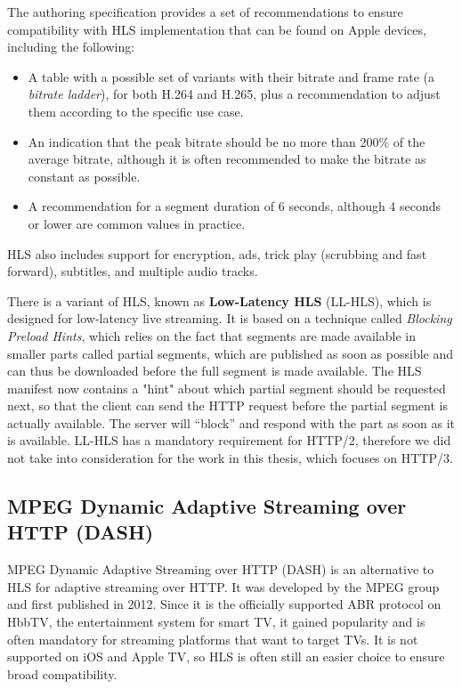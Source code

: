 The authoring specification provides a set of recommendations to ensure compatibility with HLS implementation that can be found on Apple devices, including the following:

\begin{itemize}
    \item A table with a possible set of variants with their bitrate and frame rate (a \textit{bitrate ladder}), for both H.264 and H.265, plus a recommendation to adjust them according to the specific use case.
    \item An indication that the peak bitrate should be no more than 200\% of the average bitrate, although it is often recommended to make the bitrate as constant as possible.\cite{ozer}
    \item A recommendation for a segment duration of 6 seconds, although 4 seconds or lower are common values in practice.\cite{ozer}
\end{itemize}

HLS also includes support for encryption, ads, trick play (scrubbing and fast forward), subtitles, and multiple audio tracks.

There is a variant of HLS, known as \textbf{Low-Latency HLS} (LL-HLS), which is designed for low-latency live streaming. It is based on a technique called \textit{Blocking Preload Hints}, which relies on the fact that segments are made available in smaller parts called partial segments, which are published as soon as possible and can thus be downloaded before the full segment is made available. The HLS manifest now contains a "hint" about which partial segment should be requested next, so that the client can send the HTTP request before the partial segment is actually available. The server will “block” and respond with the part as soon as it is available. LL-HLS has a mandatory requirement for HTTP/2, therefore we did not take into consideration for the work in this thesis, which focuses on HTTP/3.

\subsection{MPEG Dynamic Adaptive Streaming over HTTP (DASH)}
\label{sec:bg/technologies/dash}

MPEG Dynamic Adaptive Streaming over HTTP (DASH) is an alternative to HLS for adaptive streaming over HTTP. It was developed by the MPEG group and first published in 2012. Since it is the officially supported ABR protocol on HbbTV, the entertainment system for smart TV, it gained popularity and is often mandatory for streaming platforms that want to target TVs. It is not supported on iOS and Apple TV, so HLS is often still an easier choice to ensure broad compatibility.

